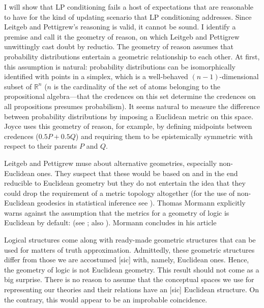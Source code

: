 \documentclass[smallextended]{svjour3}       %
\begin{document}
I will show that LP conditioning fails a host of expectations that are
reasonable to have for the kind of updating scenario that LP
conditioning addresses. Since Leitgeb and Pettigrew's reasoning is
valid, it cannot be sound. I identify a premise and call it the
geometry of reason, on which Leitgeb and Pettigrew unwittingly cast
doubt by reductio. The geometry of reason assumes that probability
distributions entertain a geometric relationship to each other. At
first, this assumption is natural: probability distributions can be
isomorphically identified with points in a simplex, which is a
well-behaved $(n-1)$-dimensional subset of $\mathbb{R}^{n}$ ($n$ is
the cardinality of the set of atoms belonging to the propositional
algebra---that the credences on this set determine the credences on
all propositions presumes probabilism). It seems natural to measure
the difference between probability distributions by imposing a
Euclidean metric on this space. Joyce uses this geometry of reason,
for example, by defining midpoints between credences ($0.5P+0.5Q$) and
requiring them to be epistemically symmetric with respect to their
parents $P$ and $Q$.

Leitgeb and Pettigrew muse about alternative geometries, especially
non-Euclidean ones. They suspect that these would be based on and in
the end reducible to Euclidean geometry but they do not entertain the
idea that they could drop the requirement of a metric topology
altogether (for the use of non-Euclidean geodesics in statistical
inference see ). Thomas Mormann explicitly warns
against the assumption that the metrics for a geometry of logic is
Euclidean by default:  (see ; also
). Mormann concludes in his article

\begin{quotex}
  Logical structures come along with ready-made geometric structures
  that can be used for matters of truth approximation. Admittedly,
  these geometric structures differ from those we are accostumed [sic]
  with, namely, Euclidean ones. Hence, the geometry of logic is not
  Euclidean geometry. This result should not come as a big surprise.
  There is no reason to assume that the conceptual spaces we use for
  representing our theories and their relations have an [sic]
  Euclidean structure. On the contrary, this would appear to be an
  improbable coincidence. 
\end{quotex}
\end{document}
